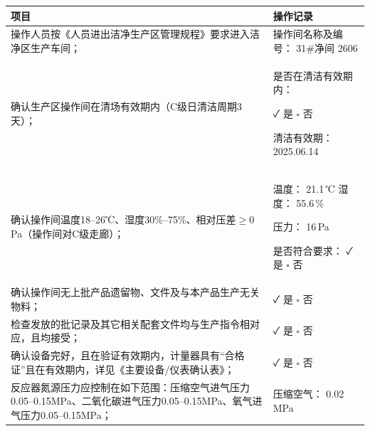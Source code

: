 \documentclass[UTF8,10pt,a4paper,fontset=fandol]{ctexart}
\newcommand{\fieldvalue}[1]{#1}
\newcommand{\handwritten}[1]{#1}
\begin{document}
\begin{tabularx}{\textwidth}{|p{}|X|}
\hline
\centering 项目 & \centering 操作记录 \arraybackslash \\
\hline
操作人员按《人员进出洁净生产区管理规程》要求进入洁净区生产车间； &
操作间名称及编号：
\fieldvalue{\handwritten{31\#净间 2606}} \\
\hline
确认生产区操作间在清场有效期内（C级日清洁周期3天）； &
是否在清洁有效期内：

\fieldvalue{\handwritten{✓}} 是 \quad $\square$ 否

清洁有效期：
\fieldvalue{\handwritten{2025.06.14}} \\
\hline
确认操作间温度18--26℃、湿度30\%--75\%、相对压差$\geq 0$Pa（操作间对C级走廊）； &
温度：
\fieldvalue{\handwritten{21.1}}\,℃ \quad
湿度：
\fieldvalue{\handwritten{55.6}}\,\%

压力：
\fieldvalue{\handwritten{16}}\,Pa

是否符合要求：
\fieldvalue{\handwritten{✓}} 是 \quad $\square$ 否 \\
\hline
确认操作间无上批产品遗留物、文件及与本产品生产无关物料； &
\fieldvalue{\handwritten{✓}} 是 \quad $\square$ 否 \\
\hline
检查发放的批记录及其它相关配套文件均与生产指令相对应，且均接受； &
\fieldvalue{\handwritten{✓}} 是 \quad $\square$ 否 \\
\hline
确认设备完好，且在验证有效期内，计量器具有“合格证”且在有效期内，详见《主要设备/仪表确认表》； &
\fieldvalue{\handwritten{✓}} 是 \quad $\square$ 否 \\
\hline
反应器氮源压力应控制在如下范围：压缩空气进气压力0.05--0.15MPa、二氧化碳进气压力0.05--0.15MPa、氧气进气压力0.05--0.15MPa； &
压缩空气：
\fieldvalue{\handwritten{0.02}}\,MPa


\end{tabularx}
\end{document}
